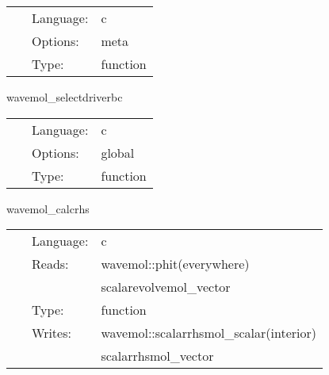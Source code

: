 \hspace{5mm}{\it register variables for mol } 


\hspace{5mm}

 \begin{tabular*}{160mm}{cll} 
~ & Language:  & c \\ 
~ & Options:  & meta \\ 
~ & Type:  & function \\ 
\end{tabular*} 


\vspace{5mm}


\hspace{5mm} wavemol\_selectdriverbc 

\hspace{5mm}{\it choose boundary condtion for driver to apply } 


\hspace{5mm}

 \begin{tabular*}{160mm}{cll} 
~ & Language:  & c \\ 
~ & Options:  & global \\ 
~ & Type:  & function \\ 
\end{tabular*} 


\vspace{5mm}


\hspace{5mm} wavemol\_calcrhs 

\hspace{5mm}{\it register rhs calculation for mol } 


\hspace{5mm}

 \begin{tabular*}{160mm}{cll} 
~ & Language:  & c \\ 
~ & Reads:  & wavemol::phit(everywhere) \\ 
~& ~ &scalarevolvemol\_vector\\ 
~ & Type:  & function \\ 
~ & Writes:  & wavemol::scalarrhsmol\_scalar(interior) \\ 
~& ~ &scalarrhsmol\_vector\\ 
\end{tabular*} 



